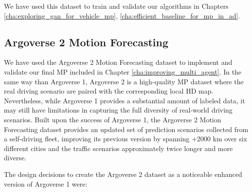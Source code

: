 We have used this dataset to train and validate our algorithms in Chapters \ref{cha:exploring_gan_for_vehicle_mp}, \ref{cha:efficient_baseline_for_mp_in_ad}.

\subsection{Argoverse 2 Motion Forecasting}
\label{subsec:2_argoverse_2}

We have used the Argoverse 2 \cite{wilson2023argoverse} Motion Forecasting dataset to implement and validate our final \ac{MP} included in Chapter \ref{cha:improving_multi_agent}. In the same way than Argoverse 1, Argoverse 2 is a high-quality \ac{MP} dataset where the real driving scenario are paired with the corresponding local HD map. Nevertheless, while Argoverse 1 provides a substantial amount of labeled data, it may still have limitations in capturing the full diversity of real-world driving scenarios. Built upon the success of Argoverse 1, the Argoverse 2 Motion Forecasting dataset provides an updated set of prediction scenarios collected from a self-driving fleet, improving its previous version by spanning +2000 km over six different cities and the traffic scenarios approximately twice longer and more diverse.

\begin{comment}
\begin{figure}[h]
	\centering
	\texttt{[image: chapter\_2\_related\_works/mp\_mf\_score\_plateau.pdf]}
	\caption[MinFDE metric values for submissions on Argoverse 1 over time]{MinFDE metric values for submissions on Argoverse 1 over time. Individual points indicate submissions to the public leader board. Colors indicate specific competition phases. The solid black line indicates SOTA performance}
	\label{fig:chapter_2_related_works/mp_mf_score_plateau}
\end{figure}
\end{comment}
	
The design decisions \cite{wilson2023argoverse} to create the Argoverse 2 dataset as a noticeable enhanced version of Argoverse 1 were:

